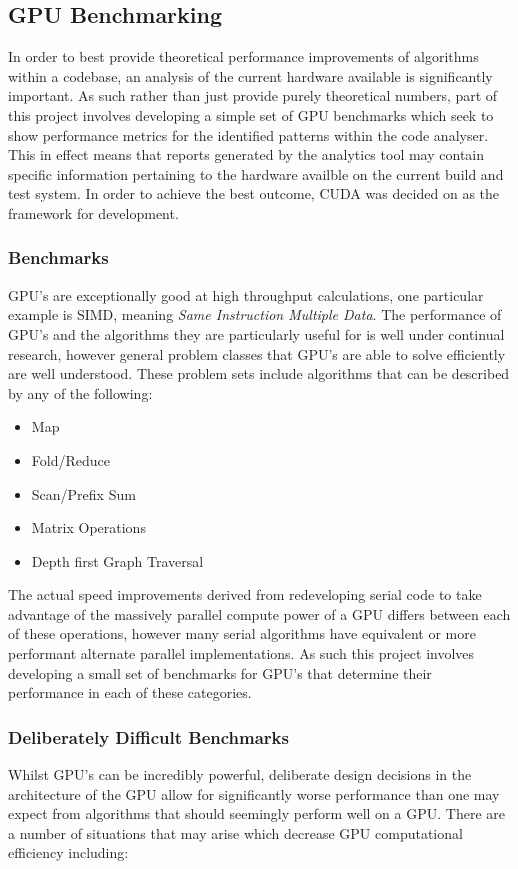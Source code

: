\subsection{GPU Benchmarking}
In order to best provide theoretical performance improvements of algorithms within a codebase, an analysis of the current hardware available is significantly important. As such rather than just provide purely theoretical numbers, part of this project involves developing a simple set of GPU benchmarks which seek to show performance metrics for the identified patterns within the code analyser. This in effect means that reports generated by the analytics tool may contain specific information pertaining to the hardware availble on the current build and test system. In order to achieve the best outcome, CUDA was decided on as the framework for development.

\subsubsection{Benchmarks}
GPU's are exceptionally good at high throughput calculations, one particular example is SIMD, meaning \emph{Same Instruction Multiple Data}. The performance of GPU's and the algorithms they are particularly useful for is well under continual research, however general problem classes that GPU's are able to solve efficiently are well understood. These problem sets include algorithms that can be described by any of the following:

\begin{itemize}
\item Map
\item Fold/Reduce
\item Scan/Prefix Sum
\item Matrix Operations
\item Depth first Graph Traversal
\end{itemize}

The actual speed improvements derived from redeveloping serial code to take advantage of the massively parallel compute power of a GPU differs between each of these operations, however many serial algorithms have equivalent or more performant alternate parallel implementations. As such this project involves developing a small set of benchmarks for GPU's that determine their performance in each of these categories.

\subsubsection{Deliberately Difficult Benchmarks}
Whilst GPU's can be incredibly powerful, deliberate design decisions in the architecture of the GPU allow for significantly worse performance than one may expect from algorithms that should seemingly perform well on a GPU. There are a number of situations that may arise which decrease GPU computational efficiency including:

